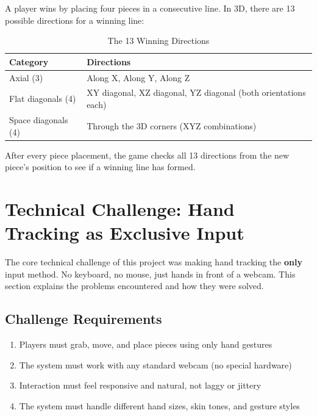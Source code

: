 \documentclass[11pt]{article}
\begin{document}
A player wins by placing four pieces in a consecutive line. In 3D, there are 13 possible directions for a winning line:

\begin{table}[H]
\centering
\caption{The 13 Winning Directions}
\begin{tabular}{ll}
\toprule
\textbf{Category} & \textbf{Directions} \\
\midrule
Axial (3) & Along X, Along Y, Along Z \\
Flat diagonals (4) & XY diagonal, XZ diagonal, YZ diagonal (both orientations each) \\
Space diagonals (4) & Through the 3D corners (XYZ combinations) \\
\bottomrule
\end{tabular}
\end{table}

After every piece placement, the game checks all 13 directions from the new piece's position to see if a winning line has formed.

\section{Technical Challenge: Hand Tracking as Exclusive Input}

The core technical challenge of this project was making hand tracking the \textbf{only} input method. No keyboard, no mouse, just hands in front of a webcam. This section explains the problems encountered and how they were solved.

\subsection{Challenge Requirements}

\begin{enumerate}
    \item Players must grab, move, and place pieces using only hand gestures
    \item The system must work with any standard webcam (no special hardware)
    \item Interaction must feel responsive and natural, not laggy or jittery
    \item The system must handle different hand sizes, skin tones, and gesture styles
\end{enumerate}
\end{document}
